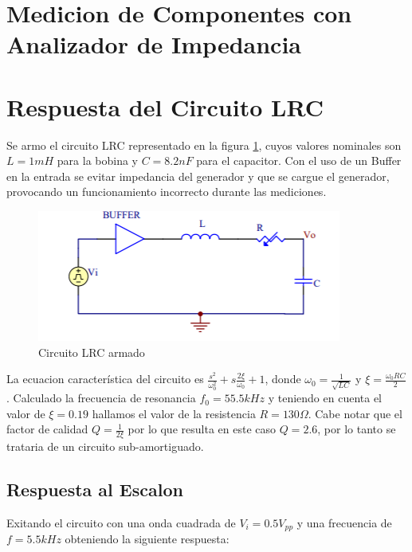 



\onehalfspacing



\section{Medicion de Componentes con Analizador de Impedancia}


\section{Respuesta del Circuito LRC}

Se armo el circuito LRC representado en la figura \ref{fig:LRC1}, cuyos valores nominales son $L=1mH$ para la bobina y $C=8.2nF$ para el capacitor. Con el uso de un Buffer en la entrada se evitar impedancia del generador y que se cargue el generador, provocando un funcionamiento incorrecto durante las mediciones.

\begin{figure}[h!]
\centering
\includegraphics[scale=0.5]{lrcCircuito.png}
\caption{Circuito LRC armado}
\label{fig:LRC1}
\end{figure}

La ecuacion característica del circuito es $\frac{s^2}{\omega_0^2}+s\frac{2\xi}{\omega_0}+1$, donde $\omega_0 = \frac{1}{\sqrt{LC}}$ y $\xi = \frac{\omega_0RC}{2}$. Calculado la frecuencia de resonancia $f_0=55.5kHz$ y teniendo en cuenta el valor de $\xi = 0.19$ hallamos el valor de la resistencia $R = 130\Omega$. Cabe notar que el factor de calidad $Q = \frac{1}{2\xi}$ por lo que resulta en este caso $Q = 2.6$, por lo tanto se trataria de un circuito sub-amortiguado. 

\subsection{Respuesta al Escalon}

Exitando el circuito con una onda cuadrada de $V_i = 0.5V_{pp}$ y una frecuencia de $f = 5.5kHz$ obteniendo la siguiente respuesta:

